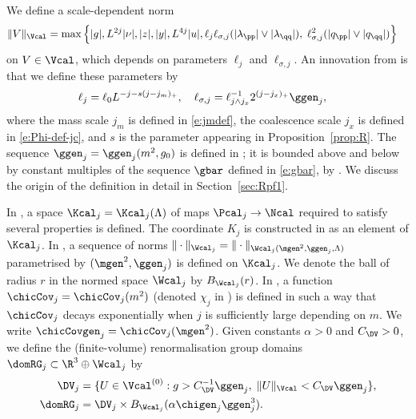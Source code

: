 We define a scale-dependent norm
\begin{equation}
\label{e:Vnormdef}
\begin{aligned}
\|V\|_{\Vcal} &=
\max\Big\{
|g|, L^{2j}|\nu|, |z|, |y|,  L^{4j}|u|,
\ell_j\ell_{\sigma,j}(|\lambda_\pp|\vee|\lambda_\qq|),\;
 \ell_{\sigma,j}^{2} (|q_\pp|\vee|q_\qq|)
\Big\}
\end{aligned}
\end{equation}
on $V \in \Vcal$, which depends on parameters $\ell_j$ and $\ell_{\sigma,j}$.
An innovation from \cite{BSTW-clp} is that we define these parameters by
\begin{align}
\label{e:elldef-zz}
\ell_j &= \ell_0 L^{-j - s (j - j_m)_+}, \quad
\ell_{\sigma,j}
=
\ell_{j \wedge j_{x}}^{-1} 2^{(j - j_{x})_+} \ggen_j,
\end{align}
where the mass scale $j_m$ is defined in \eqref{e:jmdef},
the coalescence scale
$j_x$ is defined in \eqref{e:Phi-def-jc},
and $s$ is the parameter appearing in Proposition~\ref{prop:R}.
The sequence $\ggen_j = \ggen_j(m^2,g_0)$ is defined in
\cite[\eqref{log-e:ggendef}]{BBS-saw4-log};
it is bounded above and below by constant multiples of
the sequence $\gbar$ defined in
\eqref{e:gbar},
by
\cite[Lemma~\ref{log-lem:gbarmcomp}]{BBS-saw4-log}.
We discuss the origin of the definition  in detail
in Section~\ref{sec:Rpf1}.

In \cite[Definition~\ref{step-def:Kspace}]{BS-rg-step},
a space $\Kcal_j = \Kcal_j(\Lambda)$ of maps $\Pcal_j \to \Ncal$ required to satisfy
several properties is defined.
The coordinate $K_j$ is constructed in \cite{BS-rg-step} as an element of $\Kcal_j$.
In \cite[Section~\ref{step-sec:Knorms}]{BS-rg-step},
a sequence of norms $\|\cdot\|_{\Wcal_j} = \|\cdot\|_{\Wcal_j(\mgen^2, \ggen_j, \Lambda)}$
parametrised by $(\mgen^2, \ggen_j)$ is defined on $\Kcal_j$.
We denote the ball of radius $r$ in
the normed space $\Wcal_j$ by $B_{\Wcal_j}(r)$.
In \cite[\eqref{log-e:mass-scale}--\eqref{log-e:chidef}]{BBS-saw4-log},
a function $\chicCov_j = \chicCov_j(m^2)$ (denoted $\chi_j$ in \cite{BBS-saw4-log})
is defined in such a way that $\chicCov_j$ decays exponentially
when $j$ is sufficiently large depending on $m$.
We write $\chicCovgen_j = \chicCov_j(\mgen^2)$.
Given constants $\alpha > 0$ and $C_\DV > 0$,
we define the (finite-volume)
renormalisation group domains $\domRG_j \subset \R^3 \oplus \Wcal_j$ by
\begin{align}
\label{e:DVdef}
    \DV_j &= \{U\in \Vcal^{(0)} :
    g> C_{\DV}^{-1} \ggen_j  , \;  \|U\|_{\Vcal} < C_{\DV} \ggen_j \},
\\
\domRG_j &= \DV_j \times B_{\Wcal_j}(\alpha \chigen_j \ggen_j^3).
\end{align}

